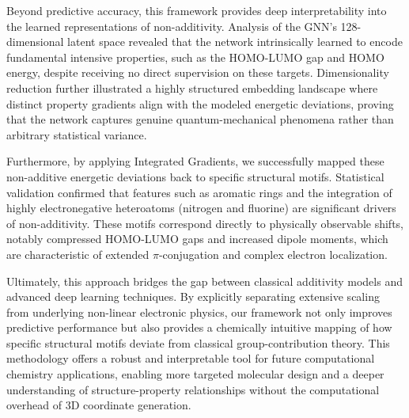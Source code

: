 \documentclass[]{article}
\begin{document}
Beyond predictive accuracy, this framework provides deep interpretability into the learned representations of non-additivity. Analysis of the GNN's 128-dimensional latent space revealed that the network intrinsically learned to encode fundamental intensive properties, such as the HOMO-LUMO gap and HOMO energy, despite receiving no direct supervision on these targets. Dimensionality reduction further illustrated a highly structured embedding landscape where distinct property gradients align with the modeled energetic deviations, proving that the network captures genuine quantum-mechanical phenomena rather than arbitrary statistical variance.

Furthermore, by applying Integrated Gradients, we successfully mapped these non-additive energetic deviations back to specific structural motifs. Statistical validation confirmed that features such as aromatic rings and the integration of highly electronegative heteroatoms (nitrogen and fluorine) are significant drivers of non-additivity. These motifs correspond directly to physically observable shifts, notably compressed HOMO-LUMO gaps and increased dipole moments, which are characteristic of extended $\pi$-conjugation and complex electron localization. 

Ultimately, this approach bridges the gap between classical additivity models and advanced deep learning techniques. By explicitly separating extensive scaling from underlying non-linear electronic physics, our framework not only improves predictive performance but also provides a chemically intuitive mapping of how specific structural motifs deviate from classical group-contribution theory. This methodology offers a robust and interpretable tool for future computational chemistry applications, enabling more targeted molecular design and a deeper understanding of structure-property relationships without the computational overhead of 3D coordinate generation.


{}

\end{document}
